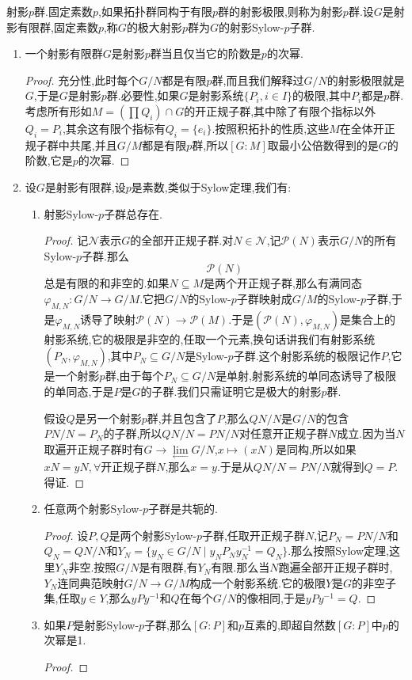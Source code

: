 射影$p$群.固定素数$p$,如果拓扑群同构于有限$p$群的射影极限,则称为射影$p$群.设$G$是射影有限群,固定素数$p$,称$G$的极大射影$p$群为$G$的射影Sylow-$p$子群.
\begin{enumerate}
	\item 一个射影有限群$G$是射影$p$群当且仅当它的阶数是$p$的次幂.
	\begin{proof}
		
		充分性,此时每个$G/N$都是有限$p$群,而且我们解释过$G/N$的射影极限就是$G$,于是$G$是射影$p$群.必要性,如果$G$是射影系统$\{P_i,i\in I\}$的极限,其中$P_i$都是$p$群.考虑所有形如$M=(\prod Q_i)\cap G$的开正规子群,其中除了有限个指标以外$Q_i=P_i$,其余这有限个指标有$Q_i=\{e_i\}$.按照积拓扑的性质,这些$M$在全体开正规子群中共尾,并且$G/M$都是有限$p$群,所以$[G:M]$取最小公倍数得到的是$G$的阶数,它是$p$的次幂.
	\end{proof}
    \item 设$G$是射影有限群,设$p$是素数,类似于Sylow定理,我们有:
    \begin{enumerate}
    	\item 射影Sylow-$p$子群总存在.
    	\begin{proof}
    		
    		记$\mathscr{N}$表示$G$的全部开正规子群.对$N\in\mathscr{N}$,记$\mathscr{P}(N)$表示$G/N$的所有Sylow-$p$子群.那么$$\mathscr{P}(N)$$总是有限的和非空的.如果$N\subseteq M$是两个开正规子群,那么有满同态$\varphi_{M,N}:G/N\to G/M$.它把$G/N$的Sylow-$p$子群映射成$G/M$的Sylow-$p$子群,于是$\varphi_{M,N}$诱导了映射$\mathscr{P}(N)\to\mathscr{P}(M)$.于是$(\mathscr{P}(N),\varphi_{M,N})$是集合上的射影系统,它的极限是非空的,任取一个元素,换句话讲我们有射影系统$(P_N,\varphi_{M,N})$,其中$P_N\subseteq G/N$是Sylow-$p$子群.这个射影系统的极限记作$P$,它是一个射影$p$群,由于每个$P_N\subseteq G/N$是单射,射影系统的单同态诱导了极限的单同态,于是$P$是$G$的子群.我们只需证明它是极大的射影$p$群.
    		
    		\qquad
    		
    		假设$Q$是另一个射影$p$群,并且包含了$P$,那么$QN/N$是$G/N$的包含$PN/N=P_N$的子群,所以$QN/N=PN/N$对任意开正规子群$N$成立.因为当$N$取遍开正规子群时有$G\to\lim\limits_{\leftarrow}G/N$,$x\mapsto(xN)$是同构,所以如果$xN=yN,\forall$开正规子群$N$,那么$x=y$.于是从$QN/N=PN/N$就得到$Q=P$.得证.
    	\end{proof}
    	\item 任意两个射影Sylow-$p$子群是共轭的.
    	\begin{proof}
    		
    		设$P,Q$是两个射影Sylow-$p$子群,任取开正规子群$N$,记$P_N=PN/N$和$Q_N=QN/N$和$Y_N=\{y_N\in G/N\mid y_NP_Ny_N^{-1}=Q_N\}$.那么按照Sylow定理,这里$Y_N$非空.按照$G/N$是有限群,有$Y_N$有限.那么当$N$跑遍全部开正规子群时,$Y_N$连同典范映射$G/N\to G/M$构成一个射影系统.它的极限$Y$是$G$的非空子集,任取$y\in Y$,那么$yPy^{-1}$和$Q$在每个$G/N$的像相同,于是$yPy^{-1}=Q$.
    	\end{proof}
    	\item 如果$P$是射影Sylow-$p$子群,那么$[G:P]$和$p$互素的,即超自然数$[G:P]$中$p$的次幂是1.
    	\begin{proof}
    		

\end{proof}
\end{enumerate}
\end{enumerate}
